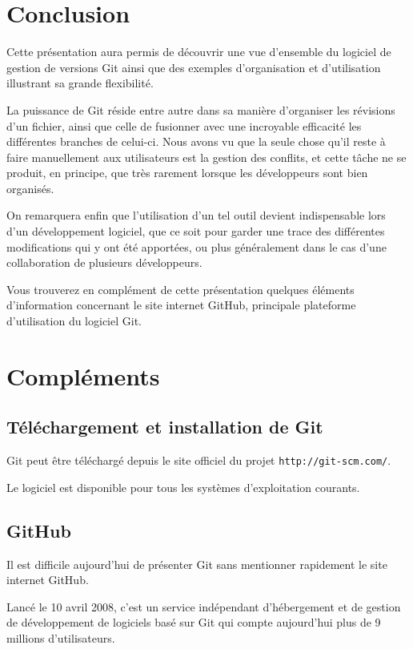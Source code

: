\documentclass[11pt,a4paper]{article}
\begin{document}
\section{Conclusion}

Cette présentation aura permis de découvrir une vue d'ensemble du logiciel de gestion de versions Git ainsi que des exemples d'organisation et d'utilisation illustrant sa grande flexibilité. 

La puissance de Git réside entre autre dans sa manière d'organiser les révisions d'un fichier, ainsi que celle de fusionner avec une incroyable efficacité les différentes branches de celui-ci. Nous avons vu que la seule chose qu'il reste à faire manuellement aux utilisateurs est la gestion des conflits, et cette tâche ne se produit, en principe, que très rarement lorsque les développeurs sont bien organisés.

On remarquera enfin que l'utilisation d'un tel outil devient indispensable lors d'un développement logiciel, que ce soit pour garder une trace des différentes modifications qui y ont été apportées, ou plus généralement dans le cas d'une collaboration de plusieurs développeurs.

Vous trouverez en complément de cette présentation quelques éléments d'information concernant le site internet GitHub, principale plateforme d'utilisation du logiciel Git.
\pagebreak
{}
\section{Compléments}

\subsection{Téléchargement et installation de Git}

Git peut être téléchargé depuis le site officiel du projet {\tt http://git-scm.com/}.

Le logiciel est disponible pour tous les systèmes d'exploitation courants.

\subsection{GitHub}

Il est difficile aujourd'hui de présenter Git sans mentionner rapidement le site internet GitHub.

Lancé le 10 avril 2008, c'est un service indépendant d'hébergement et de gestion de développement de logiciels basé sur Git qui compte aujourd'hui plus de 9 millions d'utilisateurs.
\end{document}
